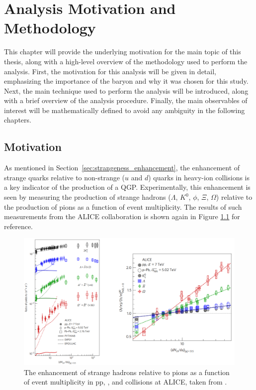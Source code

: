 \chapter{Analysis Motivation and Methodology}
\label{ch:analysis_mnm}

This chapter will provide the underlying motivation for the main topic of this thesis, along with a high-level overview of the methodology used to perform the analysis. First, the motivation for this analysis will be given in detail, emphasizing the importance of the \lmb baryon and why it was chosen for this study. Next, the main technique used to perform the analysis will be introduced, along with a brief overview of the analysis procedure. Finally, the main observables of interest will be mathematically defined to avoid any ambiguity in the following chapters.

\section{Motivation}
As mentioned in Section~\ref{sec:strangeness_enhancement}, the enhancement of strange quarks relative to non-strange ($u$ and $d$) quarks in heavy-ion collisions is a key indicator of the production of a QGP. Experimentally, this enhancement is seen by measuring the production of strange hadrons ($\Lambda$, $K^0$, $\phi$, $\Xi$, $\Omega$) relative to the production of pions as a function of event multiplicity. The results of such measurements from the ALICE collaboration is shown again in Figure \ref{fig:ref_enhancement} for reference. 

\begin{figure}
\centering
\includegraphics[width=\textwidth]{figures/introduction/strangeness_enhancement.png}
\caption{The enhancement of strange hadrons relative to pions as a function of event multiplicity in pp, \pPb, and \PbPb collisions at ALICE, taken from \cite{NATURE}.}
\label{fig:ref_enhancement}
\end{figure}

